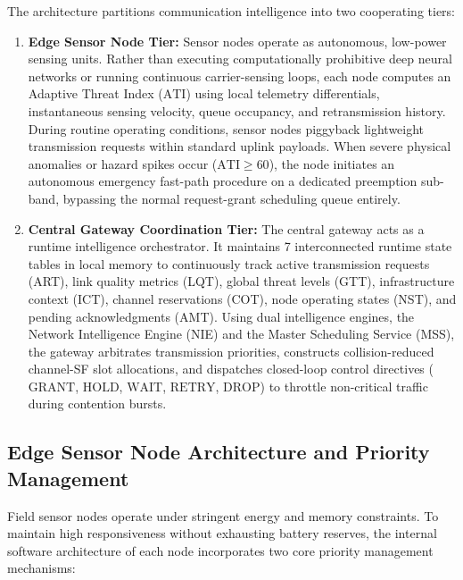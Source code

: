 \documentclass[preprint,review,12pt]{elsarticle}
\begin{document}
The architecture partitions communication intelligence into two cooperating tiers:
\begin{enumerate}
    \item \textbf{Edge Sensor Node Tier:} Sensor nodes operate as autonomous, low-power sensing units. Rather than executing computationally prohibitive deep neural networks or running continuous carrier-sensing loops, each node computes an Adaptive Threat Index ($\text{ATI}$) using local telemetry differentials, instantaneous sensing velocity, queue occupancy, and retransmission history. During routine operating conditions, sensor nodes piggyback lightweight transmission requests within standard uplink payloads. When severe physical anomalies or hazard spikes occur ($\text{ATI} \ge 60$), the node initiates an autonomous emergency fast-path procedure on a dedicated preemption sub-band, bypassing the normal request-grant scheduling queue entirely.

    \item \textbf{Central Gateway Coordination Tier:} The central gateway acts as a runtime intelligence orchestrator. It maintains 7 interconnected runtime state tables in local memory to continuously track active transmission requests (ART), link quality metrics (LQT), global threat levels (GTT), infrastructure context (ICT), channel reservations (COT), node operating states (NST), and pending acknowledgments (AMT). Using dual intelligence engines, the Network Intelligence Engine (NIE) and the Master Scheduling Service (MSS), the gateway arbitrates transmission priorities, constructs collision-reduced channel-SF slot allocations, and dispatches closed-loop control directives ($\text{GRANT}$, $\text{HOLD}$, $\text{WAIT}$, $\text{RETRY}$, $\text{DROP}$) to throttle non-critical traffic during contention bursts.
\end{enumerate}

\subsection{Edge Sensor Node Architecture and Priority Management}
Field sensor nodes operate under stringent energy and memory constraints. To maintain high responsiveness without exhausting battery reserves, the internal software architecture of each node incorporates two core priority management mechanisms:
\end{document}
